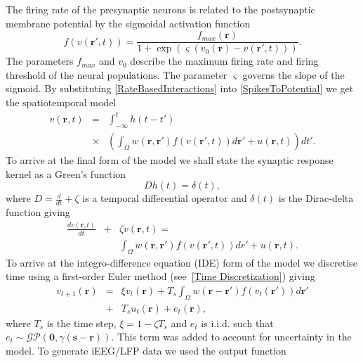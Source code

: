 \documentclass[twocolumn,11pt,a4paper]{article}		%
\begin{document}
The firing rate of the presynaptic neurons is related to the postsynaptic membrane potential by the sigmoidal activation function 
\begin{equation}
	\label{ActivationFunction} f\left( v\left( \mathbf{r}', t \right) \right) = \frac{f_{max}\left(\mathbf{r}\right)}{1 + \exp \left( \varsigma \left( v_0\left( \mathbf{r} \right) - v\left(\mathbf{r}',t\right) \right) \right)}. 
\end{equation}
The parameters $f_{max}$ and $v_0$ describe the maximum firing rate and firing threshold of the neural populations. The parameter $\varsigma$ governs the slope of the sigmoid. By substituting \ref{RateBasedInteractions} into \ref{SpikesToPotential} we get the spatiotemporal model 
\begin{eqnarray}
	\label{FullDoubleIntModel} v\left(\mathbf{r},t\right) &=&  \int_{-\infty}^t h\left(t - t'\right) \\
	&\times&\left(\int_\Omega w\left(\mathbf{r},\mathbf{r}'\right) f\left( v\left( \mathbf{r}',t \right)\right)d\mathbf{r}' + u(\mathbf{r},t) \right)dt'. \nonumber
\end{eqnarray}
To arrive at the final form of the model we shall state the synaptic response kernel as a Green's function 
\begin{equation}
	\label{GreensFuncDef} Dh\left( t \right) = \delta \left( t \right), 
\end{equation}
where $D=\frac{d}{dt} + \zeta$ is a temporal differential operator and $\delta(t)$ is the Dirac-delta function giving 
\begin{eqnarray}
	\label{FinalFormContinuous} \frac{dv\left( \mathbf{r},t \right)}{dt} &+& \zeta v\left( \mathbf{r},t \right) = \\
	&&\int_\Omega {w\left( \mathbf{r},\mathbf{r}' \right)f\left( {v\left( \mathbf{r}',t \right)} \right)dr'} + u\left(\mathbf{r},t\right). \nonumber
\end{eqnarray}
To arrive at the integro-difference equation (IDE) form of the model we discretise time using a first-order Euler method (see~\ref{Time Discretization}) giving 
\begin{eqnarray}
	\label{DiscreteTimeModel} v_{t+1}\left(\mathbf{r}\right) &=& \xi v_t\left(\mathbf{r}\right) + T_s \int_\Omega { w\left(\mathbf{r}-\mathbf{r}'\right) f\left(v_t\left(\mathbf{r}'\right)\right) d\mathbf{r}'} \nonumber\\ 
	&+& T_s u_t\left(\mathbf{r}\right) + e_t\left(\mathbf{r}\right), 
\end{eqnarray}
where $T_s$ is the time step, $\xi = 1-\zeta T_s$ and $e_t$ is i.i.d. such that $e_t\sim\mathcal{GP}(\mathbf 0,\gamma(\mathbf{s}-\mathbf{r}))$. This term was added to account for uncertainty in the model. To generate iEEG/LFP data we used the output function 
\end{document}
